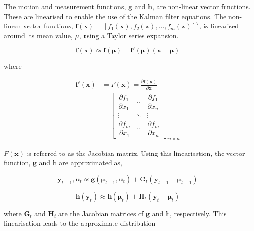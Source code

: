 The motion and measurement functions, $\mathbf{g}$ and $\mathbf{h}$, are non-linear vector functions.  These are linearised to enable the use of the Kalman filter equations. 
The non-linear vector functions, $\mathbf{f}(\mathbf{x}) = [f_1(\mathbf{x}),f_2(\mathbf{x}),...,f_m(\mathbf{x})]^T$, is linearised around its mean value, $\mu$, using
a Taylor series expansion.

\begin{equation}
    \mathbf{f}(\mathbf{x}) \approx \mathbf{f}(\boldsymbol{\mu}) + \mathbf{f}'(\boldsymbol{\mu})(\mathbf{x}-\boldsymbol{\mu})
\end{equation}

where


\begin{equation}
  \begin{aligned}
    \mathbf{f}'(\mathbf{x})
      &= \mathit{F}(\mathbf{x})
       = \frac{\partial \mathbf{f}(\mathbf{x})}{\partial \mathbf{x}} \\
      &=
    \begin{bmatrix}
      \dfrac{\partial f_1}{\partial x_1} & \cdots & \dfrac{\partial f_1}{\partial x_n} \\
      \vdots & \ddots & \vdots \\
      \dfrac{\partial f_m}{\partial x_1} & \cdots & \dfrac{\partial f_m}{\partial x_n}
    \end{bmatrix}_{m \times n}
  \end{aligned}
\end{equation}

$\mathit{F}(\mathbf{x})$ is referred to as the Jacobian matrix. Using this linearisation, the vector function, $\mathbf{g}$ and $\mathbf{h}$
are approximated as,

\begin{equation}
    \mathbf{y}_{t-1}, \mathbf{u}_t \approx \mathbf{g}(\boldsymbol{\mu}_{t-1}, \mathbf{u}_t) + \mathbf{G}_t (\mathbf{y}_{t-1} - \boldsymbol{\mu}_{t-1})
\end{equation}

\begin{equation}
    \mathbf{h}(\mathbf{y}_t) \approx \mathbf{h}(\boldsymbol{\mu}_t) + \mathbf{H}_t (\mathbf{y}_t - \boldsymbol{\mu}_t)
\end{equation}

where \( \mathbf{G}_t \) and \( \mathbf{H}_t \) are the Jacobian matrices of \( \mathbf{g} \) and \( \mathbf{h} \), respectively. This linearisation leads to the approximate distribution

